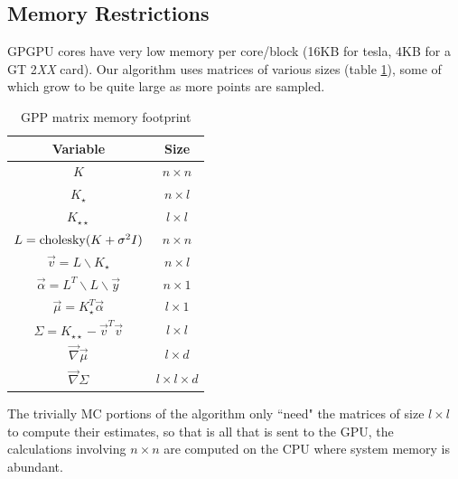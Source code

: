 \documentclass[phd,tocprelim]{cornell}
\begin{document}
%
%

\subsection{Memory Restrictions} %
\label{sub:Memory Restrictions}

GPGPU cores have very low memory per core/block (16KB for tesla, 4KB for a GT 2{\it XX} card). Our algorithm uses matrices of various sizes (table \ref{EPImemory}), some of which grow to be quite large as more points are sampled.

\begin{table}
    \caption{GPP matrix memory footprint}
    \label{EPImemory}
\begin{center}
    \begin{tabular}{c|c}
    Variable & Size \\
    \hline
    $K$ & $n \times n$ \\
    $K_{\star }$ & $n \times l$ \\
    $K_{\star \star }$ & $l \times l$ \\ 
    $L = {\rm cholesky}(K + \sigma^{2}I) $ & $n \times n$ \\
    $\vec{v} = L \backslash K_{\star }$ & $n \times l$ \\
    $\vec{\alpha} = L^{T} \backslash L \backslash \vec{y}$ & $n \times 1$ \\
    $\vec{\mu} = K_{\star }^{T}\vec{\alpha}$ & $l \times 1$  \\
    $\Sigma = K_{\star \star} - \vec{v}^{T}\vec{v}$ & $l \times l$ \\
    $\vec{\nabla} \vec{\mu}$ & $l \times d$ \\
    $\vec{\nabla} \Sigma$ & $l \times l \times d$
    \end{tabular}
\end{center}
\end{table}

The trivially MC portions of the algorithm only ``need" the matrices of size $l \times l$ to compute their estimates, so that is all that is sent to the GPU, the calculations involving $n \times n$ are computed on the CPU where system memory is abundant.
\end{document}
